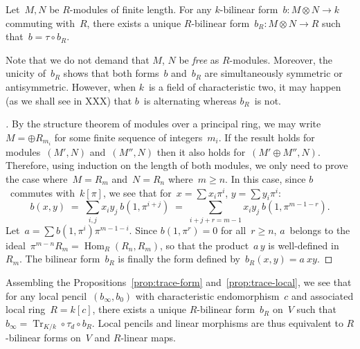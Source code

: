\documentclass{article}%
\def\transpose#1{{\vphantom{#1}}^{\mathrm{t}}\!#1}
\DeclareMathOperator\Hom{Hom}
\DeclareMathOperator\Tr{Tr}
\begin{document}
\begin{prop}\label{prop:trace-local}%
Let~$M, N$ be $R$-modules of finite length.
For any $k$-bilinear form~$b: M ⊗ N → k$ commuting with~$R$,
there exists a unique $R$-bilinear form~$b_R: M ⊗ N → R$ such that~$b = τ
∘ b_R$.
\end{prop}

Note that we do not demand that $M$, $N$ be \emph{free} as $R$-modules.
Moreover, the unicity of~$b_R$ shows that both forms~$b$ and~$b_R$ are
simultaneously symmetric or antisymmetric. However, when $k$~is a field
of characteristic two, it may happen (as we shall see in XXX) that $b$~is
alternating whereas $b_R$~is not.

\begin{proof}[]
By the structure theorem of modules over a principal ring, we may
write~$M = ⊕ R_{m_i}$ for some finite sequence of integers~$m_i$. If the
result holds for modules~$(M', N)$ and~$(M'', N)$ then it also holds
for~$(M' ⊕ M'', N)$. Therefore, using induction on the length of both
modules, we only need to prove the case where~$M = R_m$ and~$N = R_n$
where~$m ≥ n$. In this case, since $b$~commutes with~$k[π]$, we see that
for~$x = ∑ x_i π^i$, $y = ∑ y_i π^i$:
\begin{equation}
b(x,y) \;=\; ∑_{i,j} x_i y_j\: b(1, π^{i+j})
  \;=\; ∑_{i+j+r = m-1} x_i y_j\: b(1, π^{m-1-r}).
\end{equation}
Let~$a = ∑ b(1, π^{i}) π^{m-1-i}$. Since $b(1, π^{r}) = 0$ for all~$r ≥
n$, $a$~belongs to the ideal~$π^{m-n} R_m = \Hom_R (R_n, R_m)$, so that
the product~$a\,y$ is well-defined in~$R_m$. The bilinear form~$b_R$ is
finally the form defined by~$b_R(x,y) = a\:x y$.
\end{proof}%

Assembling the Propositions~\ref{prop:trace-form}
and~\ref{prop:trace-local}, we see that for any local pencil~$(b_{∞},
b_0)$ with characteristic endomorphism~$c$ and associated local ring~$R =
k[c]$, there exists a unique $R$-bilinear form~$b_R$
on~$V$ such that~$b_{∞} = \Tr_{K/k} ∘ τ_d ∘ b_R$.
Local pencils and linear morphisms are thus equivalent to $R$-bilinear
forms on~$V$ and $R$-linear maps.
\end{document}

